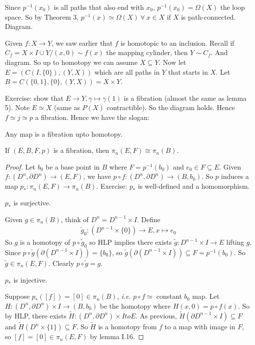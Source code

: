 \documentclass[12pt,class=article,crop=false]{standalone}
\begin{document}
\begin{remark}
Since $ p ^{-1}(x_0)$ is all paths that also end with $ x_0$, $ p ^{-1}(x_0) = \Omega(X)$ the loop space. So by Theorem 3, $ p ^{-1}(x) \simeq \Omega(X) \ \forall \ x \in X$ if $ X$ is path-connected. Diagram.
\end{remark}
\begin{eg}
	Given $ f: X \to Y$, we saw earlier that $ f$ is homotopic to an inclusion. Recall if  $ C_f = X\times I \cup Y / (x,0) \sim f(x)$ the mapping cylinder, then $ Y \sim C_f$. And diagram. So up to homotopy we can assume $ X \subseteq Y$. Now let $ E = (C(I, \{0\} ),(Y,X))$ which are all paths in $ Y$ that starts in  $ X$. Let  $ B = C(\{0,1\}, \{0\} ,(Y,X) ) = X \times Y$.

	Exercise: show that $ E \to Y, \gamma \mapsto \gamma(1)$ is a fibration (almost the same as lemma 5). Note $ E \simeq X$ (same as $ P(X)$ contractible). So the diagram holds. Hence  $ f \simeq j \simeq p$ a fibration. Hence we have the slogan:
	
	Any map is a fibration upto homotopy.
\end{eg}

\begin{lem}
If $ (E,B,F,p)$ is a fibration, then  $ \pi_n(E,F) \cong \pi_n(B)$.
\end{lem}
\begin{proof}
Let $ b_0$ be a base point in $ B$ where  $ F=p ^{-1}(b_0)$ and $ e_0 \in F \subseteq E$. Given $ f:(D^{n}, \partial D^{n}) \to (E,F)$, we have $ p \circ f: (D^{n}, \partial D^{n}) \to (B,b_0)$. So $ p$ induces a map  $ p_*: \pi_n(E,F) \to \pi_n(B)$. Exercise: $ p_*$ is well-defined and a homomorphism.
 \begin{claim}
$ p_*$ is surjective.
\end{claim}
Given $ g \in \pi_n(B)$, think of $ D^{n} = D^{n-1} \times I$. Define
\begin{align*}
	\widetilde{ g}_0: (D^{n-1} \times \{0\} ) \to E, x\mapsto e_0
\end{align*}
So $ g$ is a homotopy of  $ p \circ \widetilde{ g}_0$ so HLP implies there exists $ \widetilde{ g}: D^{n-1} \times I \to E$ lifting $ g$. Since  $ p \circ \widetilde{ g}( \partial (D^{n-1} \times I)) = \{b_0\} $, so $ \widetilde{ g}(\partial (D^{n-1} \times I)) \subseteq F = p^{-1}(b_0)$. So $ \widetilde{ g} \in \pi_n(E,F)$. Clearly $ p \circ \widetilde{ g} = g$.
\begin{claim}
$ p_*$ is injective.
\end{claim}
Suppose $ p_*([f]) =[0] \in \pi_n(B)$, \emph{i.e.} $ p \circ f \simeq$ constant $ b_0$ map. Let $ H:(D^{n}, \partial D^{n}) \times I \to (B,b_0)$ be the homotopy where $ H(x,0)= p \circ f(x)$. So by HLP, there exists $ \widetilde{ H}: (D^{n}, \partial D^{n}) \times I to E$. As previous, $ \widetilde{ H}(\partial D^{n-1}\times I) \subseteq F$ and $ \widetilde{ H}(D^{n} \times \{1\} ) \subseteq F$. So $ \widetilde{ H}$ is a homotopy from $ f$ to a map with image in  $ F$, so  $ [f] = [0] \in \pi_n(E,F)$ by lemma I.16.
\end{proof}
\end{document}
